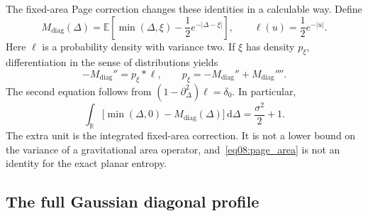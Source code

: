 \documentclass[11pt,letterpaper]{article}
\newcommand{\E}{\mathbb{E}}
\newcommand{\dd}{\mathrm{d}}
\theoremstyle{plain}
\theoremstyle{definition}
\theoremstyle{remark}
\begin{document}
The fixed-area Page correction changes these identities in a calculable way. Define
\begin{equation}
 M_{\mathrm{diag}}(\Delta)
 =\E\left[\min(\Delta,\xi)-\frac12e^{-|\Delta-\xi|}\right],
 \qquad \ell(u)=\frac12e^{-|u|}.
 \label{eq08:diagonal_minimum}
\end{equation}
Here $\ell$ is a probability density with variance two. If $\xi$ has density $p_\xi$, differentiation in the sense of distributions yields
\begin{equation}
 -M_{\mathrm{diag}}''=p_\xi*\ell,
 \qquad
 p_\xi=-M_{\mathrm{diag}}''+M_{\mathrm{diag}}''''.
 \label{eq08:page_convolution}
\end{equation}
The second equation follows from $(1-\partial_\Delta^2)\ell=\delta_0$. In particular,
\begin{equation}
 \int_{\mathbb R}
 \bigl[\min(\Delta,0)-M_{\mathrm{diag}}(\Delta)\bigr]\,\dd\Delta
 =\frac{\sigma^2}{2}+1.
 \label{eq08:page_area}
\end{equation}
The extra unit is the integrated fixed-area correction. It is not a lower bound on the variance of a gravitational area operator, and~\eqref{eq08:page_area} is not an identity for the exact planar entropy.

\subsection{The full Gaussian diagonal profile}
\label{app08:gaussian}
\end{document}
